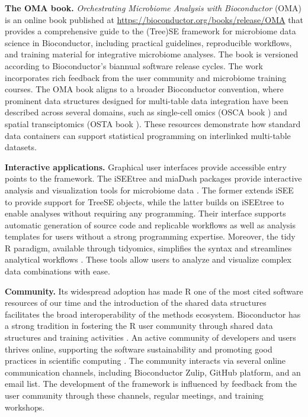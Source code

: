 \documentclass[
  sn-nature,
]{sn-jnl}
\begin{document}
\textbf{The OMA book.} \emph{Orchestrating Microbiome Analysis with
Bioconductor} (OMA) is an online book published at
\url{https://bioconductor.org/books/release/OMA} that provides a
comprehensive guide to the (Tree)SE framework for microbiome data
science in Bioconductor, including practical guidelines, reproducible
workflows, and training material for integrative microbiome analyses.
The book is versioned according to Bioconductor's biannual software
release cycles. The work incorporates rich feedback from the user
community and microbiome training courses. The OMA book aligns to a
broader Bioconductor convention, where prominent data structures
\citep{huber2015, ramos2017, huang2021} designed for multi-table data
integration have been described across several domains, such as
single-cell omics (OSCA book \citep{amezquita2020}) and spatial
transciptomics (OSTA book \citep{crowell2025}). These resources
demonstrate how standard data containers can support statistical
programming on interlinked multi-table datasets.

\textbf{Interactive applications.} Graphical user interfaces provide
accessible entry points to the framework. The iSEEtree and miaDash
packages provide interactive analysis and visualization tools for
microbiome data \citep{benedetti2025}. The former extends iSEE to
provide support for TreeSE objects, while the latter builds on iSEEtree
to enable analyses without requiring any programming. Their interface
supports automatic generation of source code and replicable workflows as
well as analysis templates for users without a strong programming
expertise. Moreover, the tidy R paradigm, available through tidyomics,
simplifies the syntax and streamlines analytical workflows
\citep{hutchison2024}. These tools allow users to analyze and visualize
complex data combinations with ease.

\textbf{Community.} Its widespread adoption has made R one of the most
cited software resources of our time \citep{pearson2025} and the
introduction of the shared data structures facilitates the broad
interoperability of the methods ecosystem. Bioconductor has a strong
tradition in fostering the R user community through shared data
structures and training activities \citep{drnevich2025}. An active
community of developers and users thrives online, supporting the
software sustainability and promoting good practices in scientific
computing \citep{wilson2017}. The community interacts via several online
communication channels, including Bioconductor Zulip, GitHub platform,
and an email list. The development of the framework is influenced by
feedback from the user community through these channels, regular
meetings, and training workshops.
\end{document}
